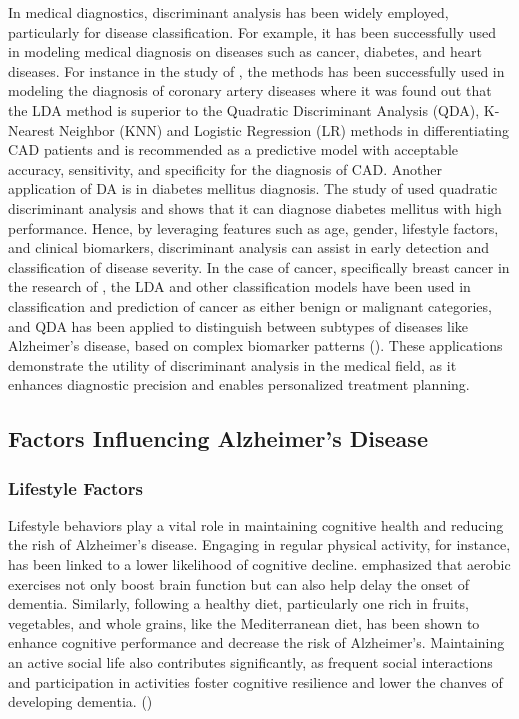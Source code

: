 \documentclass[12pt]{article}
\begin{document}
In medical diagnostics, discriminant analysis has been widely employed, particularly for disease classification. For example, it has been successfully used in modeling medical diagnosis on diseases such as cancer, diabetes, and heart diseases. For instance in the study of \cite{Shariatnia2022}, the methods has been successfully used in modeling the diagnosis of coronary artery diseases where it was found out that the LDA method is superior to the Quadratic Discriminant Analysis (QDA), K-Nearest Neighbor (KNN) and Logistic Regression (LR) methods 
in differentiating CAD patients and is recommended as a predictive model with acceptable accuracy, sensitivity, and specificity for the diagnosis of CAD. Another application of DA is in diabetes mellitus diagnosis. The study of \cite{Kresnawati2023} used quadratic discriminant analysis and shows that it can diagnose diabetes mellitus with high performance. Hence, by leveraging features such as age, gender, lifestyle factors, and clinical biomarkers, discriminant analysis can assist in early detection and classification of disease severity. 
In the case of cancer, specifically breast cancer in the research of \cite{Adebiyi2022}, the LDA and other classification models have been used in classification and prediction of cancer as  either benign or malignant categories, and QDA has been applied to distinguish between subtypes of diseases like Alzheimer's disease, based on complex biomarker patterns (\cite{Santos2022}). 
These applications demonstrate the utility of discriminant analysis in the medical field, as it enhances diagnostic precision and enables personalized treatment planning.



\subsection{Factors Influencing Alzheimer's Disease}
\subsubsection {Lifestyle Factors}
\noindent

Lifestyle behaviors play a vital role in maintaining cognitive health and reducing the rish of Alzheimer's disease. Engaging in regular physical activity, for instance, has been linked to a lower likelihood of cognitive decline. \cite{Dominguez2021} emphasized that aerobic
exercises not only boost brain function but can also help delay the onset of dementia. Similarly, following a healthy diet, particularly one rich in fruits, vegetables, and whole grains, like the Mediterranean diet, has been shown to enhance cognitive performance and decrease
the risk of Alzheimer's. Maintaining an active social life also contributes significantly, as frequent social interactions and participation in activities foster cognitive resilience and lower the chanves of developing dementia. (\cite{Dominguez2021})
\end{document}
